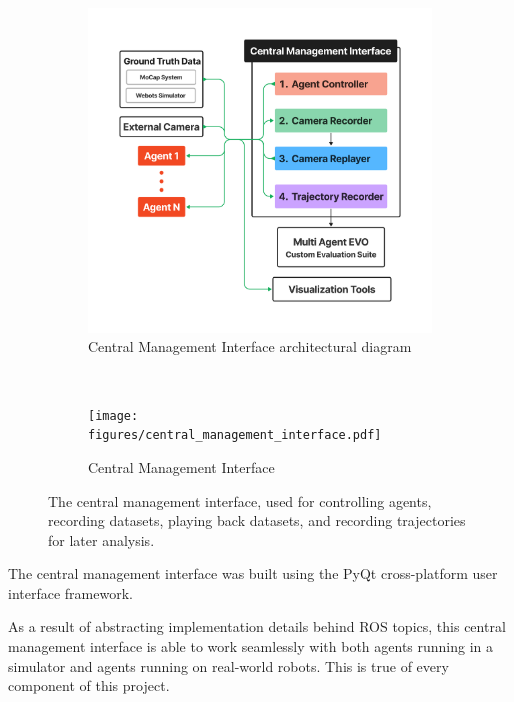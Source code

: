 \begin{figure}[h]
    \centering
    \begin{subfigure}[t]{0.425\textwidth}
        \centering
        \includegraphics[trim=5cm 0cm 5cm 5cm, width=\linewidth]{figures/central_management_interface_diagram.pdf}
        \caption{Central Management Interface architectural diagram}
    \end{subfigure}\hfill%
    ~
    \begin{subfigure}[t]{0.5\textwidth}
        \centering
        \texttt{[image: figures/central\_management\_interface.pdf]}
        \caption{Central Management Interface}
    \end{subfigure}%

    \caption{The central management interface, used for controlling agents, recording datasets, playing back datasets, and recording trajectories for later analysis.}
    \label{fig:central-management-interface}
\end{figure}

The central management interface was built using the PyQt cross-platform user interface framework.

As a result of abstracting implementation details behind ROS topics, this central management interface is able to work seamlessly with both agents running in a simulator and agents running on real-world robots. This is true of every component of this project.

